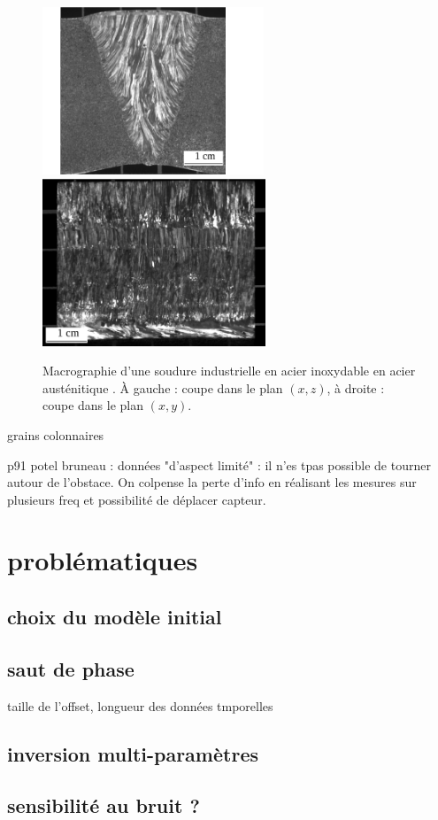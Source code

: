 \begin{figure}
	\includegraphics[height=5cm]{./img/soudure1.png}
	\includegraphics[height=5cm]{./img/soudure2.png}
	\caption{Macrographie d'une soudure industrielle en acier inoxydable en acier austénitique \citep{chassignole}. À gauche : coupe dans le plan $(x,z)$, à droite : coupe dans le plan $(x,y)$.}
\end{figure}


grains colonnaires

p91 potel bruneau : données "d'aspect limité" : il n'es tpas possible de tourner autour de l'obstace. On colpense la perte d'info en réalisant les mesures sur plusieurs freq et possibilité de déplacer capteur.


\section{problématiques}
\subsection{choix du modèle initial}
\subsection{saut de phase}
taille de l'offset, longueur des données tmporelles

\subsection{inversion multi-paramètres}

\subsection{sensibilité au bruit ?}